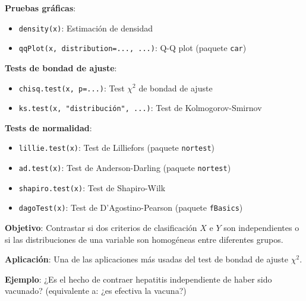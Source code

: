 \documentclass[10pt,a4paper]{article}
\begin{document}
\begin{tcolorbox}[title=Guía Rápida de Funciones R]
    \textbf{Pruebas gráficas}:
    \begin{itemize}
        \item \texttt{density(x)}: Estimación de densidad
        \item \texttt{qqPlot(x, distribution=..., ...)}: Q-Q plot (paquete \texttt{car})
    \end{itemize}
    
    \textbf{Tests de bondad de ajuste}:
    \begin{itemize}
        \item \texttt{chisq.test(x, p=...)}: Test $\chi^2$ de bondad de ajuste
        \item \texttt{ks.test(x, "distribución", ...)}: Test de Kolmogorov-Smirnov
    \end{itemize}
    
    \textbf{Tests de normalidad}:
    \begin{itemize}
        \item \texttt{lillie.test(x)}: Test de Lilliefors (paquete \texttt{nortest})
        \item \texttt{ad.test(x)}: Test de Anderson-Darling (paquete \texttt{nortest})
        \item \texttt{shapiro.test(x)}: Test de Shapiro-Wilk
        \item \texttt{dagoTest(x)}: Test de D'Agostino-Pearson (paquete \texttt{fBasics})
    \end{itemize}
\end{tcolorbox}

\pagebreak


\begin{tcolorbox}[title=Introducción]
    \textbf{Objetivo}: Contrastar si dos criterios de clasificación $X$ e $Y$ son independientes o si las distribuciones de una variable son homogéneas entre diferentes grupos.
    
    \textbf{Aplicación}: Una de las aplicaciones más usadas del test de bondad de ajuste $\chi^2$.
    
    \textbf{Ejemplo}: ¿Es el hecho de contraer hepatitis independiente de haber sido vacunado? (equivalente a: ¿es efectiva la vacuna?)
\end{tcolorbox}
\end{document}
